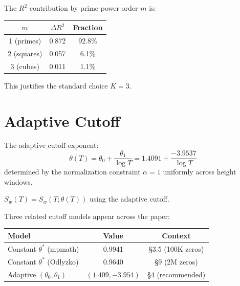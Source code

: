 \begin{remark}
    The $R^2$ contribution by prime power order $m$ is:
    \begin{center}
    \begin{tabular}{|c|c|c|}
    \hline
    $m$ & $\Delta R^2$ & Fraction \\
    \hline
    1 (primes) & 0.872 & 92.8\% \\
    2 (squares) & 0.057 & 6.1\% \\
    3 (cubes) & 0.011 & 1.1\% \\
    \hline
    \end{tabular}
    \end{center}
    This justifies the standard choice $K = 3$.
\end{remark}

\section{Adaptive Cutoff}

\begin{definition}\label{def:adaptiveTheta}
    \leanok
    The adaptive cutoff exponent:
    \[
        \theta(T) = \theta_0 + \frac{\theta_1}{\log T}
        = 1.4091 + \frac{-3.9537}{\log T}
    \]
    determined by the normalization constraint $\alpha = 1$ uniformly
    across height windows.
\end{definition}

\begin{definition}\label{def:S_adaptive}
    \leanok
    $S_w(T) = S_w(T; \theta(T))$ using the adaptive cutoff.
\end{definition}

\begin{remark}
    Three related cutoff models appear across the paper:
    \begin{center}
    \begin{tabular}{|l|c|c|}
    \hline
    \textbf{Model} & \textbf{Value} & \textbf{Context} \\
    \hline
    Constant $\theta^*$ (mpmath) & 0.9941 & \S3.5 (100K zeros) \\
    Constant $\theta^*$ (Odlyzko) & 0.9640 & \S9 (2M zeros) \\
    Adaptive $(\theta_0, \theta_1)$ & $(1.409, -3.954)$ & \S4 (recommended) \\
    \hline
    \end{tabular}
    \end{center}
\end{remark}

